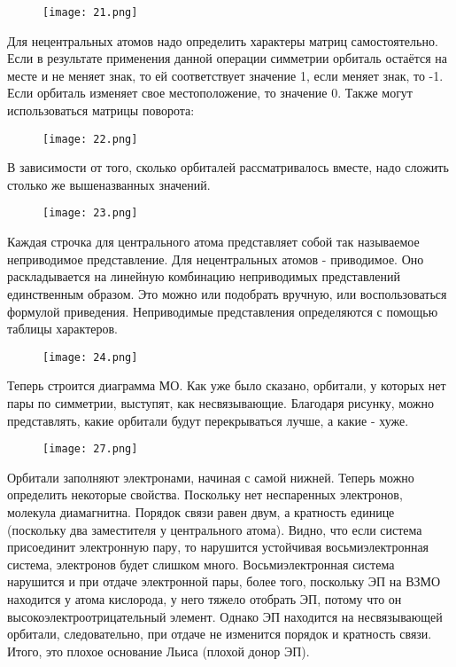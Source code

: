 \begin{figure}[H]
	\centering
	{\texttt{[image: 21.png]}}
\end{figure}


Для нецентральных атомов надо определить характеры матриц
самостоятельно. Если в результате применения данной операции
симметрии орбиталь остаётся на месте и не меняет знак, то ей
соответствует значение 1, если меняет знак, то -1. Если орбиталь
изменяет свое местоположение, то значение 0. Также могут
использоваться матрицы поворота:

\begin{figure}[H]
	\centering
	{\texttt{[image: 22.png]}}
\end{figure}



В зависимости от того, сколько орбиталей рассматривалось вместе,
надо сложить столько же вышеназванных значений.

\begin{figure}[H]
	\centering
	{\texttt{[image: 23.png]}}
\end{figure}

Каждая строчка для центрального атома представляет собой так
называемое неприводимое представление. Для нецентральных
атомов - приводимое. Оно раскладывается на линейную
комбинацию неприводимых представлений единственным образом.
Это можно или подобрать вручную, или воспользоваться формулой
приведения. Неприводимые представления определяются с
помощью таблицы характеров.

\begin{figure}[H]
	\centering
	{\texttt{[image: 24.png]}}
\end{figure}


Теперь строится диаграмма МО. Как уже было сказано, орбитали, у
которых нет пары по симметрии, выступят, как несвязывающие.
Благодаря рисунку, можно представлять, какие орбитали будут
перекрываться лучше, а какие - хуже.

\begin{figure}[H]
	\centering
	{\texttt{[image: 27.png]}}
\end{figure}

Орбитали заполняют электронами, начиная с самой нижней. Теперь
можно определить некоторые свойства. Поскольку нет
неспаренных электронов, молекула диамагнитна. Порядок связи
равен двум, а кратность единице (поскольку два заместителя у
центрального атома). Видно, что если система присоединит
электронную пару, то нарушится устойчивая восьмиэлектронная
система, электронов будет слишком много. Восьмиэлектронная
система нарушится и при отдаче электронной пары, более того,
поскольку ЭП на ВЗМО находится у атома кислорода, у него тяжело
отобрать ЭП, потому что он высокоэлектроотрицательный элемент.
Однако ЭП находится на несвязывающей орбитали, следовательно,
при отдаче не изменится порядок и кратность связи. Итого, это
плохое основание Льиса (плохой донор ЭП).

